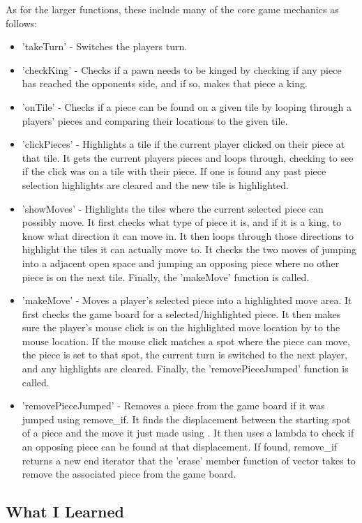 As for the larger functions, these include many of the core game mechanics as follows: 
\begin{itemize}
\item 'takeTurn' - Switches the players turn.
\item 'checkKing' - Checks if a pawn needs to be kinged by checking if any piece has reached the opponents side, and if so, makes that piece a king.
\item 'onTile' - Checks if a piece can be found on a given tile by looping through a players' pieces and comparing their locations to the given tile.
\item 'clickPieces' - Highlights a tile if the current player clicked on their piece at that tile.
It gets the current players pieces and loops through, checking to see if the click was on a tile with their piece.
If one is found any past piece selection highlights are cleared and the new tile is highlighted.
\item 'showMoves' - Highlights the tiles where the current selected piece can possibly move.
It first checks what type of piece it is, and if it is a king, to know what direction it can move in.
It then loops through those directions to highlight the tiles it can actually move to.
It checks the two moves of jumping into a adjacent open space and jumping an opposing piece where no other piece is on the next tile.
Finally, the 'makeMove' function is called.
\item 'makeMove' - Moves a player's selected piece into a highlighted move area.
It first checks the game board for a selected/highlighted piece.
It then makes sure the player's mouse click is on the highlighted move location by to the mouse location.
If the mouse click matches a spot where the piece can move, the piece is set to that spot, the current turn is switched to the next player, and any highlights are cleared.
Finally, the 'removePieceJumped' function is called.
\item 'removePieceJumped' - Removes a piece from the game board if it was jumped using remove\_if.
It finds the displacement between the starting spot of a piece and the move it just made using .
It then uses a lambda to check if an opposing piece can be found at that displacement.
If found, remove\_if returns a new end iterator that the 'erase' member function of vector takes to remove the associated piece from the game board.
\end{itemize}

\subsection{What I Learned}\label{sec:ps4:learned} %

